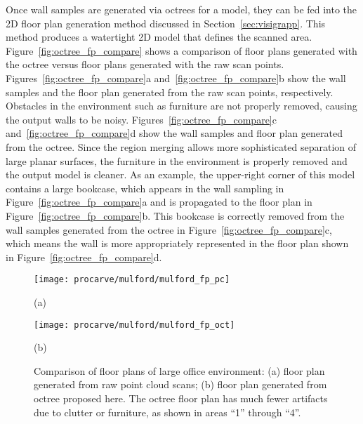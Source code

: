 \documentclass[12pt,onecolumn,oneside]{book}
\begin{document}
Once wall samples are generated via octrees for a model, they can be fed into the 2D floor plan generation method discussed in Section~\ref{sec:visigrapp}.  This method produces a watertight 2D model that defines the scanned area.  Figure~\ref{fig:octree_fp_compare} shows a comparison of floor plans generated with the octree versus floor plans generated with the raw scan points.  Figures~\ref{fig:octree_fp_compare}a and~\ref{fig:octree_fp_compare}b show the wall samples and the floor plan generated from the raw scan points, respectively.  Obstacles in the environment such as furniture are not properly removed, causing the output walls to be noisy.  Figures~\ref{fig:octree_fp_compare}c and~\ref{fig:octree_fp_compare}d show the wall samples and floor plan generated from the octree.  Since the region merging allows more sophisticated separation of large planar surfaces, the furniture in the environment is properly removed and the output model is cleaner.  As an example, the upper-right corner of this model contains a large bookcase, which appears in the wall sampling in Figure~\ref{fig:octree_fp_compare}a and is propagated to the floor plan in Figure~\ref{fig:octree_fp_compare}b.  This bookcase is correctly removed from the wall samples generated from the octree in Figure~\ref{fig:octree_fp_compare}c, which means the wall is more appropriately represented in the floor plan shown in Figure~\ref{fig:octree_fp_compare}d.

\begin{figure}[p]

	\centering
	\begin{minipage}[t]{1.0\linewidth}
		\centerline{\texttt{[image: procarve/mulford/mulford\_fp\_pc]}}
		\centerline{(a)}
	\end{minipage}

	\begin{minipage}[t]{1.0\linewidth}
		\centerline{\texttt{[image: procarve/mulford/mulford\_fp\_oct]}}
		\centerline{(b)}
	\end{minipage}

	\caption[Comparison of floor plans of large office environment.]{Comparison of floor plans of large office environment: (a) floor plan generated from raw point cloud scans; (b) floor plan generated from octree proposed here.  The octree floor plan has much fewer artifacts due to clutter or furniture, as shown in areas ``1'' through ``4''.}
	\label{fig:compare_fp_mulford}

\end{figure}
\end{document}

